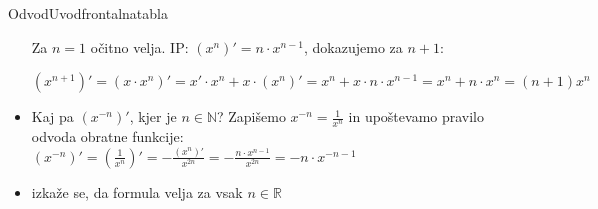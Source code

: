 \begin{priprava}{}{}{Odvod}{Uvod}{frontalna}{tabla}
\begin{itemize}
    Za $ n = 1 $ očitno velja. IP: $ (x^n)' = n \cdot x^{n - 1} $, dokazujemo za $ n + 1 $:
    
    $ (x^{n + 1})' = (x \cdot x^n)' = x' \cdot x^n + x \cdot (x^n)' = x^n + x \cdot n \cdot x^{n - 1} = x^n + n \cdot x^n = (n + 1) x^n $

    \item Kaj pa $ (x^{-n})' $, kjer je $ n \in \mathbb{N} $? Zapišemo $ x^{-n} = \frac{1}{x^{n}} $ in upoštevamo pravilo odvoda obratne funkcije: $ (x^{-n})' = \left( \frac{1}{x^{n}} \right)' = - \frac{(x^n)'}{x^{2n}} = - \frac{n \cdot x^{n - 1}}{x^{2n}} = - n \cdot x^{-n - 1} $
    \item izkaže se, da formula velja za vsak $ n \in \mathbb{R} $ 
\end{itemize} 


    
\end{priprava}